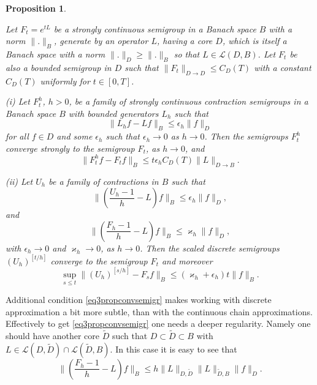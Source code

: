 \documentclass[10pt,a4paper]{amsart}
\def\LC{\mathcal{L}}
\def\ep{\epsilon}
\def\ka{\varkappa}
\newtheorem{prop}{Proposition}[section]
\begin{document}
\begin{prop}
\label{propconvsemigr}

 Let $F_t=e^{tL}$ be a strongly continuous semigroup in a Banach space $B$ with a norm $\|.\|_B$,
 generate by an operator $L$,
having a core $D$, which is itself a Banach space with a norm $\|.\|_D\ge \|.\|_B$ so that $L\in \LC(D,B)$.
Let $F_t$ be also a bounded semigroup in $D$
such that $\|F_t\|_{D\to D} \le C_D(T)$ with a constant $C_D(T)$ uniformly for $t\in [0,T]$.

(i) Let $F_t^h$, $h>0$,  be a family of strongly continuous contraction semigroups in a Banach space $B$
with bounded generators $L_h$ such that
\[
\|L_hf-Lf\|_B \le \ep_h \|f\|_D
\]
for all $f\in D$ and some $\ep_h$ such that $\ep_h\to 0$ as $h\to 0$.
 Then the semigroups $F_t^h$ converge strongly to the semigroup $F_t$, as $h\to 0$, and
\begin{equation}
\label{eq1propconvsemigr}
\|F_t^hf -F_tf\|_B \le t \ep_h C_D(T)\|L\|_{D\to B}.
\end{equation}

(ii) Let $U_h$ be a family of contractions in $B$ such that
\begin{equation}
\label{eq2propconvsemigr}
\|\left(\frac{U_h-1}{h} -L\right)f\|_B \le \ep_h \|f\|_D,
\end{equation}
and
 \begin{equation}
\label{eq3propconvsemigr}
\|\left(\frac{F_h-1}{h} -L\right)f\|_B \le \ka_h \|f\|_D,
\end{equation}
with $\ep_h \to 0$ and $\ka_h\to 0$, as $h\to 0$.
Then the scaled discrete semigroups $(U_h)^{[t/h]}$ converge to the semigroup $F_t$
and moreover
 \begin{equation}
\label{eq4propconvsemigr}
\sup_{s\le t}\|(U_h)^{[s/h]} -F_sf\|_B \le (\ka_h+\ep_h)t \|f\|_B.
\end{equation}
\end{prop}

Additional condition \eqref{eq3propconvsemigr} makes working with discrete approximation a bit more subtle,
than with the continuous chain approximations. Effectively to get \eqref{eq3propconvsemigr}
one needs a deeper regularity. Namely one should have another core $\tilde D$ such that $D\subset \tilde D\subset B$
with $L\in \LC(D,\tilde D) \cap \LC(\tilde D,B)$. In this case it is easy to see that
\begin{equation}
\label{eq5propconvsemigr}
\|\left(\frac{F_h-1}{h} -L\right)f\|_B \le h \|L\|_{D,\tilde D} \|L\|_{\tilde D,B}\|f\|_D.
\end{equation}
\end{document}
